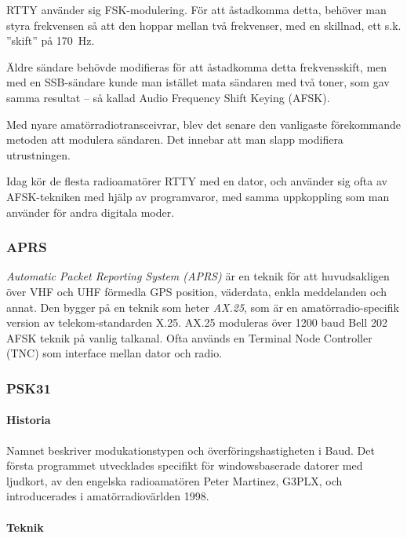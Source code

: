 RTTY använder sig FSK-modulering.
För att åstadkomma detta, behöver man styra frekvensen så att den hoppar mellan
två frekvenser, med en skillnad, ett s.k. ''skift'' på 170~Hz.

Äldre sändare behövde modifieras för att åstadkomma detta frekvensskift, men
med en SSB-sändare kunde man istället mata sändaren med två toner, som gav
samma resultat -- så kallad Audio Frequency Shift Keying (AFSK).

Med nyare amatörradiotransceivrar, blev det senare den vanligaste förekommande
metoden att modulera sändaren.
Det innebar att man slapp modifiera utrustningen.

Idag kör de flesta radioamatörer RTTY med en dator, och använder sig ofta av
AFSK-tekniken med hjälp av programvaror, med samma uppkoppling som man använder
för andra digitala moder.

\subsubsection{APRS}

\emph{Automatic Packet Reporting System (APRS)} är en teknik för att
huvudsakligen över VHF och UHF förmedla GPS position, väderdata, enkla
meddelanden och annat.
Den bygger på en teknik som heter \emph{AX.25}, som är en amatörradio-specifik
version av telekom-standarden X.25.
AX.25 moduleras över 1200 baud Bell 202 AFSK teknik på vanlig talkanal.
Ofta används en Terminal Node Controller (TNC) som interface mellan dator och
radio.

\subsubsection{PSK31}

\paragraph{Historia}

Namnet beskriver modukationstypen och överföringshastigheten i Baud.
Det första programmet utvecklades specifikt för windowsbaserade datorer med
ljudkort, av den engelska radioamatören Peter Martinez, G3PLX, och
introducerades i amatörradiovärlden 1998.

\paragraph{Teknik}

